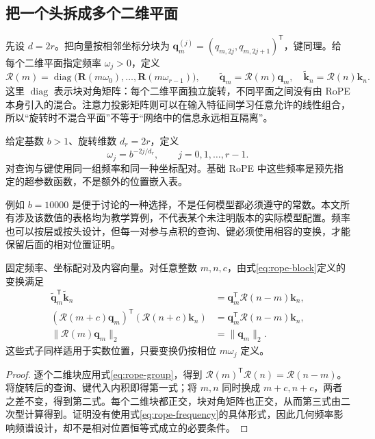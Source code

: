 \documentclass[UTF8,12pt,a4paper,fontset=fandol]{ctexart}
\begin{document}
\subsection{把一个头拆成多个二维平面}
先设 $d=2r$。把向量按相邻坐标分块为 $\mathbf q_m^{(j)}=(q_{m,2j},q_{m,2j+1})^{\mathsf T}$，键同理。给每个二维平面指定频率 $\omega_j>0$，定义
\begin{equation}
\mathcal R(m)=\operatorname{diag}\bigl(
\mathbf R(m\omega_0),\ldots,\mathbf R(m\omega_{r-1})\bigr),\qquad
\widetilde{\mathbf q}_m=\mathcal R(m)\mathbf q_m,\quad
\widetilde{\mathbf k}_n=\mathcal R(n)\mathbf k_n.
\label{eq:rope-block}
\end{equation}
这里 $\operatorname{diag}$ 表示块对角矩阵：每个二维平面独立旋转，不同平面之间没有由 RoPE 本身引入的混合。注意力投影矩阵则可以在输入特征间学习任意允许的线性组合，所以“旋转时不混合平面”不等于“网络中的信息永远相互隔离”。

\begin{definition}[本文采用的标准频率]
给定基数 $b>1$、旋转维数 $d_r=2r$，定义
\begin{equation}
\omega_j=b^{-2j/d_r},\qquad j=0,1,\ldots,r-1.
\label{eq:rope-frequency}
\end{equation}
对查询与键使用同一组频率和同一种坐标配对。基础 RoPE 中这些频率是预先指定的超参数函数，不是额外的位置嵌入表。
\end{definition}
例如 $b=10000$ 是便于讨论的一种选择，不是任何模型都必须遵守的常数。本文所有涉及该数值的表格均为教学算例，不代表某个未注明版本的实际模型配置。频率也可以按层或按头设计，但每一对参与点积的查询、键必须使用相容的变换，才能保留后面的相对位置证明。

\begin{theorem}[相对位置恒等式与范数保持]
固定频率、坐标配对及内容向量。对任意整数 $m,n,c$，由式\eqref{eq:rope-block}定义的变换满足
\begin{align}
\widetilde{\mathbf q}_m^{\mathsf T}\widetilde{\mathbf k}_n
&=\mathbf q_m^{\mathsf T}\mathcal R(n-m)\mathbf k_n,
\label{eq:rope-main}\\
(\mathcal R(m+c)\mathbf q_m)^{\mathsf T}
(\mathcal R(n+c)\mathbf k_n)
&=\mathbf q_m^{\mathsf T}\mathcal R(n-m)\mathbf k_n,
\label{eq:rope-shift}\\
\|\mathcal R(m)\mathbf q_m\|_2&=\|\mathbf q_m\|_2.
\label{eq:rope-norm}
\end{align}
这些式子同样适用于实数位置，只要变换仍按相位 $m\omega_j$ 定义。
\end{theorem}
\begin{proof}
逐个二维块应用式\eqref{eq:rope-group}，得到 $\mathcal R(m)^{\mathsf T}\mathcal R(n)=\mathcal R(n-m)$。将旋转后的查询、键代入内积即得第一式；将 $m,n$ 同时换成 $m+c,n+c$，两者之差不变，得到第二式。每个二维块都正交，块对角矩阵也正交，从而第三式由二次型计算得到。证明没有使用式\eqref{eq:rope-frequency}的具体形式，因此几何频率影响频谱设计，却不是相对位置恒等式成立的必要条件。
\end{proof}
\end{document}
